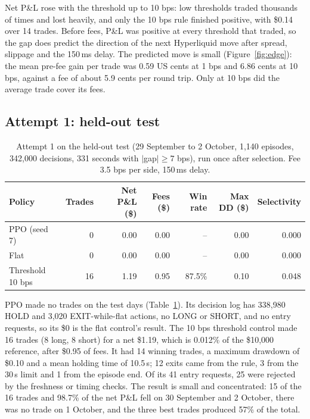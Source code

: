 \documentclass[12pt,a4paper]{article}
\DeclareRobustCommand{\bps}{\ifmmode\,\text{bps}\else\,bps\fi}
\begin{document}
Net P\&L rose with the threshold up to 10\bps: low thresholds traded thousands of times and
lost heavily, and only the 10\bps{} rule finished positive, with \$0.14 over 14 trades.
Before fees, P\&L was positive at every threshold that traded, so the gap does predict the
direction of the next Hyperliquid move after spread, slippage and the 150\,ms delay. The
predicted move is small (Figure~\ref{fig:edge}): the mean pre-fee gain per trade was 0.59 US
cents at 1\bps{} and 6.86 cents at 10\bps, against a fee of about 5.9 cents per round trip.
Only at 10\bps{} did the average trade cover its fees.

\subsection{Attempt 1: held-out test}\label{sec:test1}
\begin{table}[!htbp]
\centering
\caption{Attempt 1 on the held-out test (29 September to 2 October, 1,140 episodes, 342,000
decisions, 331 seconds with $|$gap$|\geq7$\bps), run once after selection. Fee 3.5\bps{}
per side, 150\,ms delay.}
\label{tab:test1}
\begin{tabular}{@{}lrrrrrr@{}}
\toprule
Policy & Trades & Net P\&L (\$) & Fees (\$) & Win rate & Max DD (\$) & Selectivity \\
\midrule
PPO (seed 7)        & 0  & 0.00 & 0.00 & --    & 0.00 & 0.000 \\
Flat                & 0  & 0.00 & 0.00 & --    & 0.00 & 0.000 \\
Threshold 10\bps    & 16 & 1.19 & 0.95 & 87.5\% & 0.10 & 0.048 \\
\bottomrule
\end{tabular}
\end{table}

PPO made no trades on the test days (Table~\ref{tab:test1}). Its decision log has 338,980
HOLD and 3,020 EXIT-while-flat actions, no LONG or SHORT, and no entry requests, so its
\$0 is the flat control's result. The 10\bps{} threshold control made 16 trades (8 long,
8 short) for a net \$1.19, which is 0.012\% of the \$10,000 reference, after \$0.95 of fees.
It had 14 winning trades, a maximum drawdown of \$0.10 and a mean holding time of 10.5\,s;
12 exits came from the rule, 3 from the 30\,s limit and 1 from the episode end. Of its 41
entry requests, 25 were rejected by the freshness or timing checks. The result is small and
concentrated: 15 of the 16 trades and 98.7\% of the net P\&L fell on 30 September and
2 October, there was no trade on 1 October, and the three best trades produced 57\% of the
total.
\end{document}
